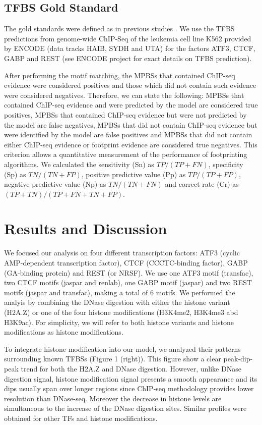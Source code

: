 \documentclass[runningheads,a4paper]{llncs}
\begin{document}
\subsection{TFBS Gold Standard\label{sc:gs}}

The gold standards were defined as in previous studies
\cite{boyle2011,cuellar2012}. We use the TFBS predictions from
genome-wide ChIP-Seq of the leukemia cell line K562 provided by ENCODE
(data tracks HAIB, SYDH and UTA) for the factors ATF3, CTCF, GABP and REST 
(see ENCODE project for exact details on TFBS prediction).

After performing the motif matching, the MPBSs that contained
ChIP-seq evidence were considered positives and those which did not
contain such evidence were considered negatives. Therefore, we can
state the following: MPBSs that contained ChIP-seq evidence and were
predicted by the model are considered true positives, MPBSs that
contained ChIP-seq evidence but were not predicted by the model are
false negatives, MPBSs that did not contain ChIP-seq evidence but
were identified by the model are false positives and MPBSs that did
not contain either ChIP-seq evidence or footprint evidence are
considered true negatives.  This criterion allows a quantitative
measurement of the performance of footprinting algorithms. 
We calculated the sensitivity (Sn) as $ TP/(TP+FN) $,
specificity (Sp) as $ TN/(TN+FP) $, positive predictive value (Pp) as
$ TP/(TP+FP) $, negative predictive value (Np) as $ TN/(TN+FN) $ and
correct rate (Cr) as $ (TP+TN)/(TP+FN+TN+FP) $.

\section{Results and Discussion}

We focused our analysis on four different transcription factors: ATF3
(cyclic AMP-dependent transcription factor), CTCF (CCCTC-binding
factor), GABP (GA-binding protein) and REST (or NRSF). We use one ATF3
motif (transfac), two CTCF motifs (jaspar and renlab), one GABP motif
(jaspar) and two REST motifs (jaspar and transfac), making a total of
6 motifs. We performed the analyis by combining the DNase digestion
with either the histone variant (H2A.Z) or one of the four histone
modifications (H3K4me2, H3K4me3 abd H3K9ac). For simplicity, we will
refer to both histone variants and histone modifications as histone
modifications.

To integrate histone modification into our model, we analyzed their
patterns surrounding known TFBSs (Figure 1 (right)). This figure show
a clear peak-dip-peak trend for both the H2A.Z and DNase digestion.
However, unlike DNase digestion signal, histone modification signal
presents a smooth appearance and its dips usually span over 
longer regions since ChIP-seq methodology provides
lower resolution than DNase-seq. Moreover the decrease in histone
levels are simultaneous to the increase of the DNase digestion sites.
Similar profiles were obtained for other TFs and histone modifications.
 
\end{document}
